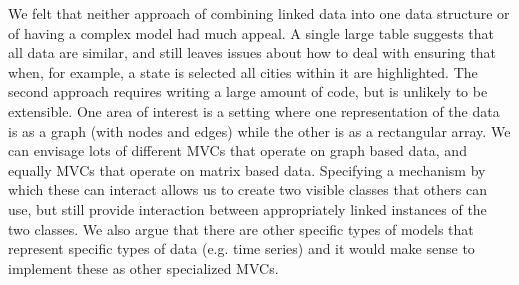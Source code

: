 \documentclass[11pt]{article}
\begin{document}
We felt that neither approach of combining linked data into one data 
structure or of having a complex model had much appeal.  A single large 
table suggests that all data are similar, and still leaves issues about how
to deal with ensuring that when, for example, a state is selected all
cities within it are highlighted.  The second approach requires writing a
large amount of code, but is unlikely to be extensible.  One area of 
interest is a setting where one representation of the data is as a
graph (with nodes and edges) while the other is as a rectangular array. 
We can envisage lots of different MVCs that operate on graph based data, and
equally MVCs that operate on matrix based data.  Specifying a mechanism
by which these can interact allows us to create two visible classes
that others can use, but still provide interaction between
appropriately linked instances of the two classes.  We also argue that
there are other specific types of models that represent
specific types of data (e.g. time series) and it would make sense to
implement these as other specialized MVCs.  


\end{document}
